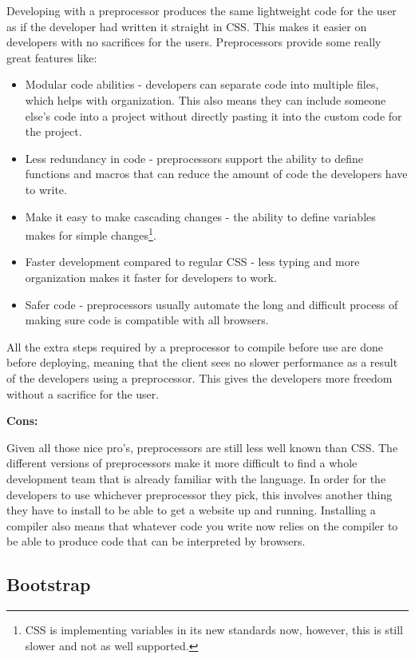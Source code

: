 \documentclass[draftclsnofoot,onecolumn,letterpaper,10pt,compsoc]{IEEEtran}
\begin{document}
    Developing with a preprocessor produces the same lightweight code for the user as if the developer had written it straight in CSS. This makes it easier on developers with no sacrifices for the users. Preprocessors provide some really great features like:
    \begin{itemize}
      \item Modular code abilities - developers can separate code into multiple files, which helps with organization. This also means they can include someone else's code into a project without directly pasting it into the custom code for the project.\cite{sass}
      \item Less redundancy in code - preprocessors support the ability to define functions and macros that can reduce the amount of code the developers have to write.
      \item Make it easy to make cascading changes - the ability to define variables makes for simple changes\footnote{CSS is implementing variables in its new standards now, however, this is still slower and not as well supported.}.
      \item Faster development compared to regular CSS - less typing and more organization makes it faster for developers to work.\cite{sass}
      \item Safer code - preprocessors usually automate the long and difficult process of making sure code is compatible with all browsers.
    \end{itemize}

    All the extra steps required by a preprocessor to compile before use are done before deploying, meaning that the client sees no slower performance as a result of the developers using a preprocessor.
    This gives the developers more freedom without a sacrifice for the user.

    \noindent \textbf{Cons:}

    Given all those nice pro's, preprocessors are still less well known than CSS.
    The different versions of preprocessors make it more difficult to find a whole development team that is already familiar with the language.
    In order for the developers to use whichever preprocessor they pick, this involves another thing they have to install to be able to get a website up and running.
    Installing a compiler also means that whatever code you write now relies on the compiler to be able to produce code that can be interpreted by browsers.


	\subsection{Bootstrap}
\end{document}

